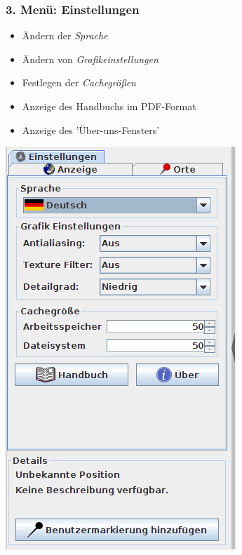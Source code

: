 \documentclass[10pt]{scrreprt}
\newcommand{\textref}[1]{\mbox{\raisebox{0.1ex}{\small$\rightarrow$ }\textit{#1}}}
\begin{document}
\subsubsection{3. Menü: Einstellungen} 
\begin{minipage}[t]{9cm}
\vspace{-40mm}
	\begin{itemize}
	\item Ändern der \textref{Sprache}
	\item Ändern von \textref{Grafikeinstellungen}
	\item Festlegen der \textref{Cachegrößen}
	\item Anzeige des Handbuchs im PDF-Format
	\item Anzeige des 'Über-uns-Fensters'
	\end{itemize}
\end{minipage}
\begin{minipage}{7cm}
\centering
\includegraphics[scale=0.4]{images/einstellungen_tab_DE.png}
\end{minipage}




\vspace{3mm}
\end{document}
